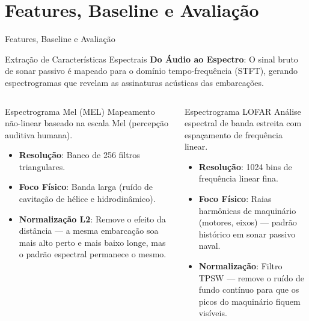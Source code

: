\documentclass{beamer}
\begin{document}
\section{Features, Baseline e Avaliação}
\begin{frame}
    \centering
    \huge Features, Baseline e Avaliação
    \label{sec:baselines}
\end{frame}
\begin{frame}{Extração de Características Espectrais}
    \footnotesize
    \textbf{Do Áudio ao Espectro}: O sinal bruto de sonar passivo é mapeado para o domínio tempo-frequência (STFT), gerando espectrogramas que revelam as assinaturas acústicas das embarcações.
    
    \vspace{0.15cm}
    \begin{columns}[t]
        \begin{block}{\small Espectrograma Mel (MEL) \cite{hummel2024}}
            \scriptsize
            Mapeamento não-linear baseado na escala Mel (percepção auditiva humana).
            \begin{itemize}
                \setlength{\itemsep}{1pt}
                \setlength{\parskip}{0pt}
                \setlength{\parsep}{0pt}
                \item \textbf{Resolução}: Banco de 256 filtros triangulares.
                \item \textbf{Foco Físico}: Banda larga (ruído de cavitação de hélice e hidrodinâmico).
                \item \textbf{Normalização L2}: Remove o efeito da distância — a mesma embarcação soa mais alto perto e mais baixo longe, mas o padrão espectral permanece o mesmo.
            \end{itemize}
        \end{block}

        \begin{block}{\small Espectrograma LOFAR \cite{fernandes2022}}
            \scriptsize
            Análise espectral de banda estreita com espaçamento de frequência linear.
            \begin{itemize}
                \setlength{\itemsep}{1pt}
                \setlength{\parskip}{0pt}
                \setlength{\parsep}{0pt}
                \item \textbf{Resolução}: 1024 bins de frequência linear fina.
                \item \textbf{Foco Físico}: Raias harmônicas de maquinário (motores, eixos) — padrão histórico em sonar passivo naval.
                \item \textbf{Normalização}: Filtro TPSW — remove o ruído de fundo contínuo para que os picos do maquinário fiquem visíveis.
            \end{itemize}
        \end{block}
    \end{columns}


\end{frame}
\end{document}
